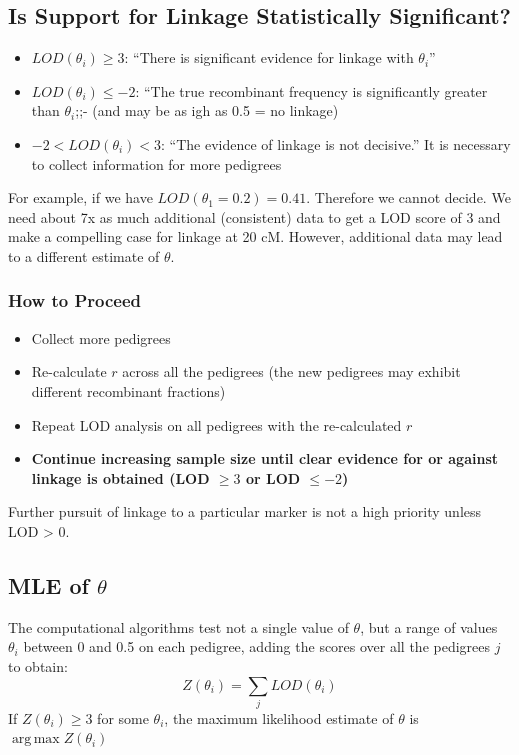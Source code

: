 \documentclass[10pt]{article}
\DeclareMathOperator*{\argmax}{arg\,max}
\begin{document}
\subsection*{Is Support for Linkage Statistically Significant?}
\begin{itemize}
	\item $LOD(\theta_i) \geq 3$: ``There is significant evidence for linkage with $\theta_i$''
	\item $LOD(\theta_i) \leq -2$: ``The true recombinant frequency is significantly greater than $\theta_i$;;- (and may be as igh as 0.5 = no linkage)
	\item $-2 < LOD(\theta_i) < 3$: ``The evidence of linkage is not decisive.''  It is necessary to collect information for more pedigrees
\end{itemize}
For example, if we have $LOD(\theta_1 = 0.2) = 0.41$.  Therefore we cannot decide.  We need about 7x as much additional (consistent) data to get a LOD score of 3 and make a compelling case for linkage at 20 cM.  However, additional data may lead to a different estimate of $\theta$.

\subsubsection*{How to Proceed}
\begin{itemize}
	\item Collect more pedigrees
	\item Re-calculate $r$ across all the pedigrees (the new pedigrees may exhibit different recombinant fractions)
	\item Repeat LOD analysis on all pedigrees with the re-calculated $r$
	\item \textbf{Continue increasing sample size until clear evidence for or against linkage is obtained (LOD $\geq 3$ or LOD $\leq -2$)}
\end{itemize}
Further pursuit of linkage to a particular marker is not a high priority unless LOD > 0.

\subsection*{MLE of $\theta$}
The computational algorithms test not a single value of $\theta$, but a range of values $\theta_i$ between 0 and 0.5 on each pedigree, adding the scores over all the pedigrees $j$ to obtain:
\[Z(\theta_i) = \sum_j LOD(\theta_i)\]
If $Z(\theta_i) \geq 3$ for some $\theta_i$, the maximum likelihood estimate of $\theta$ is $\argmax Z(\theta_i)$
\end{document}
